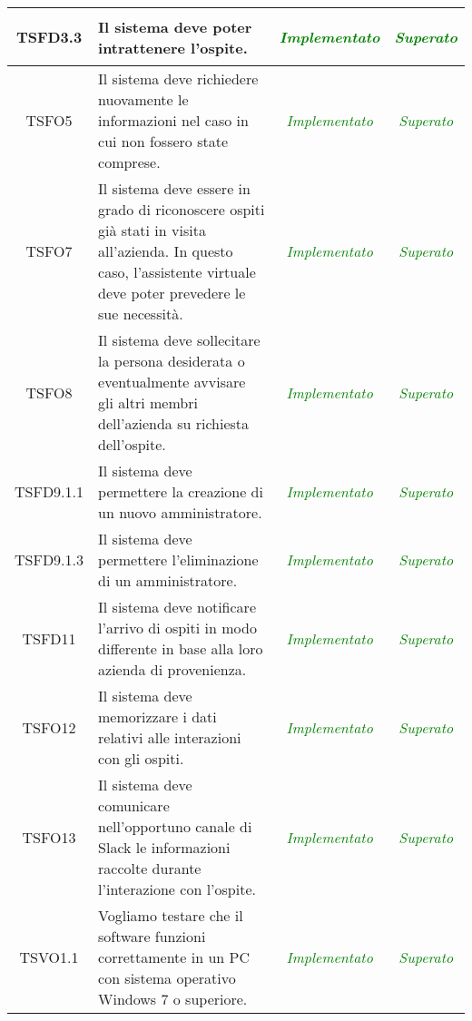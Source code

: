 \begin{longtable}{|c|>{}m{8cm}|c|c|}
\hypertarget{TSFD3.3}{TSFD3.3} & Il sistema deve poter intrattenere l'ospite. &		\textcolor{green}{\textit{Implementato}} & \textcolor{green}{\textit{Superato}}\\ \hline
\hypertarget{TSFO5}{TSFO5} & Il sistema deve richiedere nuovamente le informazioni nel caso in cui non fossero state comprese. &		\textcolor{green}{\textit{Implementato}} & \textcolor{green}{\textit{Superato}}\\ \hline
\hypertarget{TSFO7}{TSFO7} & Il sistema deve essere in grado di riconoscere ospiti già stati in visita all'azienda. In questo caso, l'assistente virtuale deve poter prevedere le sue necessità. &		\textcolor{green}{\textit{Implementato}} & \textcolor{green}{\textit{Superato}}\\ \hline
\hypertarget{TSFO8}{TSFO8} & Il sistema deve sollecitare la persona desiderata o eventualmente avvisare gli altri membri dell'azienda su richiesta dell'ospite. &		\textcolor{green}{\textit{Implementato}} & \textcolor{green}{\textit{Superato}}\\ \hline
\hypertarget{TSFD9.1.1}{TSFD9.1.1} & Il sistema deve permettere la creazione di un nuovo amministratore. &		\textcolor{green}{\textit{Implementato}} & \textcolor{green}{\textit{Superato}}\\ \hline
\hypertarget{TSFD9.1.3}{TSFD9.1.3} & Il sistema deve permettere l'eliminazione di un amministratore. &		\textcolor{green}{\textit{Implementato}} & \textcolor{green}{\textit{Superato}}\\ \hline
\hypertarget{TSFD11}{TSFD11} & Il sistema deve notificare l'arrivo di ospiti in modo differente in base alla loro azienda di provenienza. &		\textcolor{green}{\textit{Implementato}} & \textcolor{green}{\textit{Superato}}\\ \hline
\hypertarget{TSFO12}{TSFO12} & Il sistema deve memorizzare i dati relativi alle interazioni con gli ospiti. &		\textcolor{green}{\textit{Implementato}} & \textcolor{green}{\textit{Superato}}\\ \hline
\hypertarget{TSFO13}{TSFO13} & Il sistema deve comunicare nell'opportuno canale di Slack le informazioni raccolte durante l'interazione con l'ospite. &		\textcolor{green}{\textit{Implementato}} & \textcolor{green}{\textit{Superato}}\\ \hline
\hypertarget{TSVO1.1}{TSVO1.1} & Vogliamo testare che il software funzioni correttamente in un PC con sistema operativo Windows 7 o superiore.
 &		\textcolor{green}{\textit{Implementato}} & \textcolor{green}{\textit{Superato}}\\ \hline

\end{longtable}
